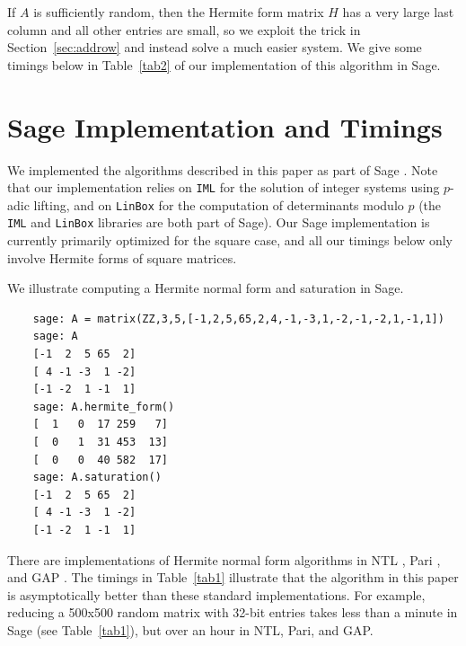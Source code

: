 \documentclass[preprint,12pt]{elsarticle}
\theoremstyle{plain}
\theoremstyle{definition}
\numberwithin{equation}{section}
\numberwithin{figure}{section}
\numberwithin{table}{section}
\begin{document}
If $A$ is sufficiently random, then the Hermite form matrix $H$ has a
very large last column and all other entries are small, so we exploit
the trick in Section~\ref{sec:addrow} and instead solve a much easier
system.  We give some timings below in Table~\ref{tab2} of our
implementation of this algorithm in Sage.


\section{Sage Implementation and Timings}\label{sec:experiments}
We implemented the algorithms described in this paper as part of Sage
\cite{sage}.  Note that our implementation relies on \texttt{IML}
\cite{iml} for the solution of integer systems using $p$-adic lifting,
and on \texttt{LinBox} \cite{linbox} for the computation of
determinants modulo $p$ (the \texttt{IML} and \texttt{LinBox}
libraries are both part of Sage).  Our Sage implementation is
currently primarily optimized for the square case, and all our timings
below only involve Hermite forms of square matrices.
  
We illustrate computing a Hermite normal form and saturation in Sage.
{\small
\begin{verbatim}
    sage: A = matrix(ZZ,3,5,[-1,2,5,65,2,4,-1,-3,1,-2,-1,-2,1,-1,1])
    sage: A
    [-1  2  5 65  2]
    [ 4 -1 -3  1 -2]
    [-1 -2  1 -1  1]
    sage: A.hermite_form()
    [  1   0  17 259   7]
    [  0   1  31 453  13]
    [  0   0  40 582  17]
    sage: A.saturation()
    [-1  2  5 65  2]
    [ 4 -1 -3  1 -2]
    [-1 -2  1 -1  1]
\end{verbatim}
}


There are implementations of Hermite normal form algorithms
in NTL \cite{ntl}, Pari \cite{pari}, and GAP \cite{gap}.
The timings in Table~\ref{tab1} illustrate that the algorithm in
this paper is asymptotically better than these standard
implementations.  For example, reducing a 500x500 random matrix with
32-bit entries takes less than a minute in Sage (see
Table~\ref{tab1}), but over an hour in NTL, Pari, and GAP.
\end{document}
